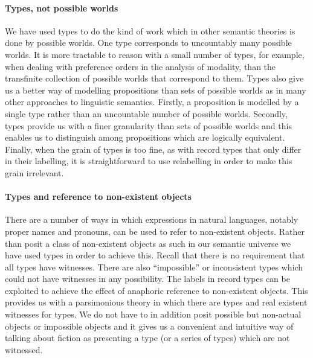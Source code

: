 \paragraph{Types, not possible worlds}  We have used types to do the
kind of work which in other semantic theories is done by possible
worlds.  One type corresponds to uncountably many possible worlds.  It
is more tractable to reason with a small number of types, for example,
when dealing with preference orders in the analysis of modality, than
the transfinite collection of possible worlds that correspond to
them.  Types also give us a better way of modelling propositions than
sets of possible worlds as in many other approaches to linguistic
semantics.  Firstly, a proposition is modelled by a single type rather
than an uncountable number of possible worlds.  Secondly, types
provide us with a finer granularity than sets of possible worlds and this
enables us to distinguish among propositions which are logically
equivalent.  Finally, when the grain of types is too fine, as with
record types that only differ in their labelling, it is
straightforward to use relabelling in order to make this grain irrelevant.

\paragraph{Types and reference to non-existent objects} There are a
number of ways in which expressions in natural languages, notably
proper names and pronouns, can be used to refer to non-existent
objects.  Rather than posit a class of non-existent objects as such in
our semantic universe we have used types in order to achieve this.
Recall that there is no requirement that all types have witnesses.
There are also ``impossible'' or inconsistent types which could not
have witnesses in any possibility.  The labels in record types can be
exploited to achieve the effect of anaphoric reference to non-existent
objects.  This provides us with a parsimonious theory in which there are
types and real existent witnesses for types.  We do not have to in
addition posit possible but non-actual objects or impossible objects
and it gives us a convenient and intuitive way of talking about fiction as
presenting a type (or a series of types) which are not witnessed.

